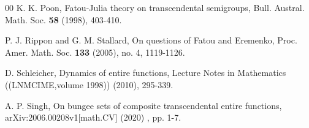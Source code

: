 \documentclass[a4paper,12pt]{amsart}
\numberwithin{equation}{section}
\begin{document}
\begin{thebibliography}{00}
 K. K. Poon, Fatou-Julia theory on transcendental semigroups, Bull. Austral. Math. Soc. \textbf{58} (1998), 403-410.

  P. J. Rippon and G. M. Stallard, On questions of Fatou and Eremenko, Proc. Amer.
Math. Soc. \textbf{133} (2005), no. 4, 1119-1126.


 D. Schleicher, Dynamics of entire functions,  Lecture Notes in Mathematics  ((LNMCIME,volume 1998)) (2010), 295-339.

 A. P. Singh, On bungee sets of composite transcendental entire functions,  arXiv:2006.00208v1[math.CV] (2020) , pp. 1-7.
\end{thebibliography}
 

 
\end{document}
